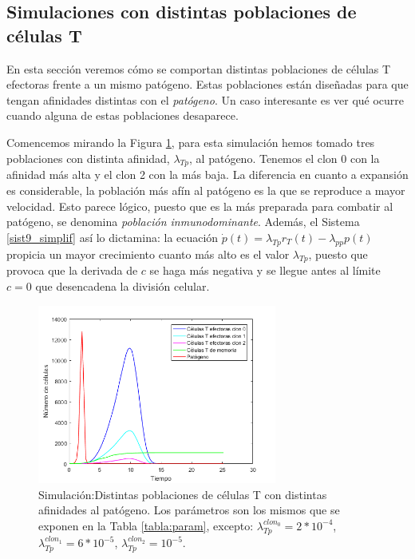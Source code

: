 \subsection{Simulaciones con distintas poblaciones de células T}

En esta sección veremos cómo se comportan distintas poblaciones de células T efectoras frente a un mismo patógeno. Estas poblaciones están diseñadas para que tengan afinidades distintas con el \textit{patógeno}. Un caso interesante es ver qué ocurre cuando alguna de estas poblaciones desaparece. 

Comencemos mirando la Figura \ref{fig:tresClones}, para esta simulación hemos tomado tres poblaciones con distinta afinidad, $\lambda_{Tp}$, al patógeno. Tenemos el clon 0 con la afinidad más alta y el clon 2 con la más baja. La diferencia en cuanto a expansión es considerable, la población más afín al patógeno es la que se reproduce a mayor velocidad. Esto parece lógico, puesto que es la más preparada para combatir al patógeno, se denomina \textit{población inmunodominante}. Además, el Sistema 	\ref{sist9_simplif} así lo dictamina: la ecuación $\dot{p}(t) = \lambda_{Tp}r_{T}(t) - \lambda_{pp}p(t)$ propicia un mayor crecimiento cuanto más alto es el valor $\lambda_{Tp}$, puesto que provoca que la derivada de $c$ se haga más negativa y se llegue antes al límite $c = 0$ que desencadena la división celular.

\begin{figure}[t]
	\centering
	\includegraphics[width=0.7\textwidth]{Imagenes/Simulaciones/tresClones}
	\caption{Simulación:Distintas poblaciones de células T con distintas afinidades al patógeno. Los parámetros son los mismos que se exponen en la Tabla \ref{tabla:param}, excepto: $\lambda_{Tp}^{clon_0} = 2*10^{-4}$, $\lambda_{Tp}^{clon_1} = 6*10^{-5}$, $\lambda_{Tp}^{clon_2} = 10^{-5}$.}
	\label{fig:tresClones}
\end{figure}


